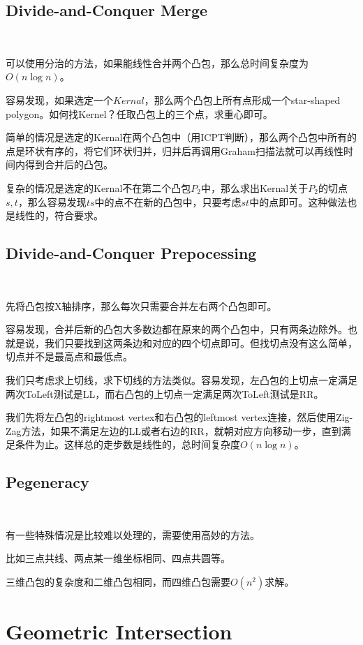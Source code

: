 \documentclass[12pt]{article}
\begin{document}
\begin{CJK*}{GBK}{song}
        \subsection{Divide-and-Conquer Merge}\
            \par 可以使用分治的方法，如果能线性合并两个凸包，那么总时间复杂度为$O(n\log n)$。
            \par 容易发现，如果选定一个$Kernal$，那么两个凸包上所有点形成一个star-shaped polygon。如何找Kernel？任取凸包上的三个点，求重心即可。
            \par 简单的情况是选定的Kernal在两个凸包中（用ICPT判断），那么两个凸包中所有的点是环状有序的，将它们环状归并，归并后再调用Graham扫描法就可以再线性时间内得到合并后的凸包。
            \par 复杂的情况是选定的Kernal不在第二个凸包$P_2$中，那么求出Kernal关于$P_2$的切点$s,t$，那么容易发现$ts$中的点不在新的凸包中，只要考虑$st$中的点即可。这种做法也是线性的，符合要求。
        \subsection{Divide-and-Conquer Prepocessing}\
            \par 先将凸包按X轴排序，那么每次只需要合并左右两个凸包即可。
            \par 容易发现，合并后新的凸包大多数边都在原来的两个凸包中，只有两条边除外。也就是说，我们只要找到这两条边和对应的四个切点即可。但找切点没有这么简单，切点并不是最高点和最低点。
            \par 我们只考虑求上切线，求下切线的方法类似。容易发现，左凸包的上切点一定满足两次ToLeft测试是LL，而右凸包的上切点一定满足两次ToLeft测试是RR。
            \par 我们先将左凸包的rightmost vertex和右凸包的leftmost vertex连接，然后使用Zig-Zag方法，如果不满足左边的LL或者右边的RR，就朝对应方向移动一步，直到满足条件为止。这样总的走步数是线性的，总时间复杂度$O(n\log n)$。
        \subsection{Pegeneracy}\
            \par 有一些特殊情况是比较难以处理的，需要使用高妙的方法。
            \par 比如三点共线、两点某一维坐标相同、四点共圆等。
            \par 三维凸包的复杂度和二维凸包相同，而四维凸包需要$O(n^2)$求解。
    \section{Geometric Intersection}\

\end{CJK*}
\end{document}
